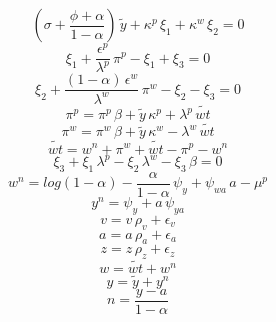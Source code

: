 \begin{dmath}
\left({{\sigma}}+\frac{{{\phi}}+{{\alpha}}}{1-{{\alpha}}}\right)\, {{\tilde{y}}}+{{\kappa^p}}\, {{\xi_1}}+{{\kappa^w}}\, {{\xi_2}}=0
\end{dmath}
\begin{dmath}
{{\xi_1}}+\frac{{{\epsilon^p}}}{{{\lambda^p}}}\, {{\pi^p}}-{{\xi_1}}+{{\xi_3}}=0
\end{dmath}
\begin{dmath}
{{\xi_2}}+\frac{\left(1-{{\alpha}}\right)\, {{\epsilon^w}}}{{{\lambda^w}}}\, {{\pi^w}}-{{\xi_2}}-{{\xi_3}}=0
\end{dmath}
\begin{dmath}
{{\pi^p}}={{\pi^p}}\, {{\beta}}+{{\tilde{y}}}\, {{\kappa^p}}+{{\lambda^p}}\, {{\tilde{wt}}}
\end{dmath}
\begin{dmath}
{{\pi^w}}={{\pi^w}}\, {{\beta}}+{{\tilde{y}}}\, {{\kappa^w}}-{{\lambda^w}}\, {{\tilde{wt}}}
\end{dmath}
\begin{dmath}
{{\tilde{wt}}}={{w^n}}+{{\pi^w}}+{{\tilde{wt}}}-{{\pi^p}}-{{w^n}}
\end{dmath}
\begin{dmath}
{{\xi_3}}+{{\xi_1}}\, {{\lambda^p}}-{{\xi_2}}\, {{\lambda^w}}-{{\xi_3}}\, {{\beta}}=0
\end{dmath}
\begin{dmath}
{{w^n}}=log\left(1-{{\alpha}}\right)-\frac{{{\alpha}}}{1-{{\alpha}}}\, {{\psi_{y}}}+{{\psi_{wa}}}\, {{a}}-{{\mu^p}}
\end{dmath}
\begin{dmath}
{{y^n}}={{\psi_{y}}}+{{a}}\, {{\psi_{ya}}}
\end{dmath}
\begin{dmath}
{{v}}={{v}}\, {{\rho_v}}+{{\epsilon_v}}
\end{dmath}
\begin{dmath}
{{a}}={{a}}\, {{\rho_a}}+{{\epsilon_a}}
\end{dmath}
\begin{dmath}
{{z}}={{z}}\, {{\rho_z}}+{{\epsilon_z}}
\end{dmath}
\begin{dmath}
{{w}}={{\tilde{wt}}}+{{w^n}}
\end{dmath}
\begin{dmath}
{{y}}={{\tilde{y}}}+{{y^n}}
\end{dmath}
\begin{dmath}
{{n}}=\frac{{{y}}-{{a}}}{1-{{\alpha}}}
\end{dmath}
